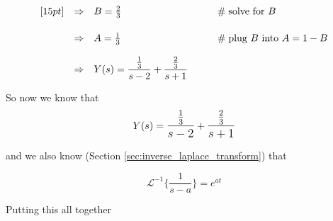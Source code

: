 \documentclass{article}
\theoremstyle{definition}
\begin{document}
\begin{equation*}
\begin{array}{lllll}
[15pt]
&\Rightarrow&  B =\frac{2}{3}                                                                                                                                 &\qquad \mathrel{\#} \text{solve for $B$}                                       \\
[15pt]
&\Rightarrow&  A =\frac{1}{3}                                                                                                                                 &\qquad \mathrel{\#} \text{plug $B$ into $A = 1 - B$}                     \\
[12pt] 
&\Rightarrow& Y(s) = \mathlarger{\frac{\frac{1}{3}}{s-2}} + \mathlarger{\frac{\frac{2}{3}}{s+1}}  
\end{array}
\end{equation*}

\bigskip
\noindent
So now we know that 
\begin{equation*}
Y(s) = \mathlarger{\frac{\frac{1}{3}}{s-2}} + \mathlarger{\frac{\frac{2}{3}}{s+1}} 
\end{equation*}

\bigskip
\noindent
and we also know (Section \ref{sec:inverse_laplace_transform}) that

\begin{equation*}
\mathcal{L}^{-1} \bigg \{ \frac{1}{s-a} \bigg \} =   e^{at}
\end{equation*}

\bigskip
\noindent
Putting this all together
\end{document}

